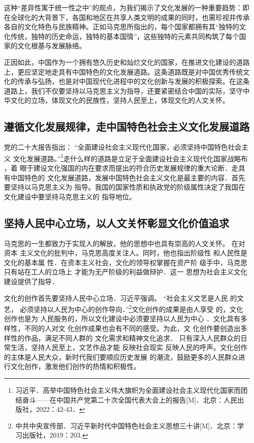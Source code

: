 \documentclass[a4paper]{ctexart}
\begin{document}
这种“差异性寓于统一性之中”的观点，为我们揭示了文化发展的一种重要趋势：即在全球化的大背景下，各国和地区在共享人类文明的成果的同时，也需珍视并传承各自的文化特色与民族精神。正如马克思所指出的，每个国家都拥有其“独特的文化传统，独特的历史命运，独特的基本国情”，这些独特的元素共同构筑了每个国家的文化根基与发展脉络。

正因如此，中国作为一个拥有悠久历史和灿烂文化的国家，在推进文化建设的道路上，更应坚定地走具有中国特色的文化发展道路。这条道路既是对中国优秀传统文化的传承与弘扬，也是对中国现代化进程中的文化创新与发展的积极探索。在这条道路上，我们不仅要坚持以马克思主义为指导，还要紧密结合中国的实际，坚守中华文化的立场，体现文化的民族性，坚持人民至上，体现文化的人文关怀。

\subsection{遵循文化发展规律，走中国特色社会主义文化发展道路}
党的二十大报告指出： “全面建设社会主义现代化国家，必须坚持中国特色社会主
义 文化发展道路。”\footnote{习近平．高举中国特色社会主义伟大旗帜\quad 为全面建设社会主义现代化国家而团结奋斗------在中国共产党第二十次全国代表大会上的报告[M]．北京：人民出版社，2022：42-43．
}走什么样的道路是立足于全面建设社会主义现代化国家战略布
，着 眼于建设文化强国的内在要求而提出的符合历史发展规律的重大论断．走具有中国特色的 文化发展道路，发展中国特色社会主义文化是最主要的内容．首先要坚持以马克思主义为 指导。我国的国家性质和执政党的阶级属性决定了我国在文化建设中要坚持马克思主义的 指导地位。

\subsection{坚持人民中心立场，以人文关怀彰显文化价值追求}
马克思的一生都致力于实现人的解放，他的思想中也具有崇高的人文关怀。
在对资本 主义文化的批判中，马克思高度关注人。同时，他也指出阶级性
和人民性是文化的基本属 性．在资本主义社会，文化的领导权掌握在资产阶
级手中，马克思只有站在工人的立场上 才能为无产阶级的利益做辩护．这一
思想为社会主义文化建设提供了指导．

文化的创作首先要坚持人民中心立场．习近平强调。 “社会主义文艺是人民
的文艺， 必须坚持以人民为中心的创作导向．”\footnote{中共中央宣传部．习近平新时代中国特色社会主义思想三十讲[M]．北京：学习出版社，2019：203.
}文化创作的成果是由人享受
的，文化创作也是为 人民服务的，所以文化建设中必须要坚持以人民为中心
．文化具有多样性，不同的人对文 化创作成果也会有不同的感受。为此，文
化创作要创造出多样性的作品，满足不同人群的 文化需求和精神文化追求．
只有深入人民群众的日常生活，坚持人民至上，文艺作品才能 反映社会现实
反映人民的呼声。文化创作的主体是人民大众，新时代我们要顺应历史发展 
的潮流，鼓励更多的人民群众进行文化创作，激发他们创作的热情和积极性。
\end{document}
